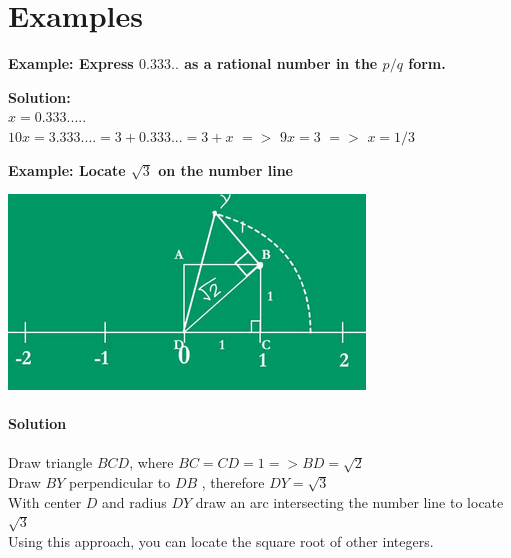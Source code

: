 \documentclass{book}
\begin{document}
	\section{Examples}
	\begin{mdframed}[backgroundcolor=yellow]
		\textbf{Example: Express $0.333..$ as a rational number in the $p/q$ form.}
	\end{mdframed}
	\textbf{Solution:} \\
	$x = 0.333.....$ \\
	$10x = 3.333.... = 3 + 0.333... = 3 + x$ $=>$ $9x =3$ $=>$ $x=1/3$ \\
	
	\begin{mdframed}[backgroundcolor=yellow]
		\textbf{Example: Locate $\sqrt{3}$ on the number line}
	\end{mdframed}
	\includegraphics[scale=0.7]{squareroot} \\ \\
\textbf{Solution} \\ \\
Draw triangle $BCD$, where $BC=CD=1 => BD = \sqrt{2}$ \\
Draw $BY$ perpendicular to $DB$ , therefore $DY = \sqrt{3}$ \\
With center $D$ and radius $DY$ draw an arc intersecting the number line to locate $\sqrt{3}$ \\
Using this approach, you can locate the square root of other integers.
\end{document}
